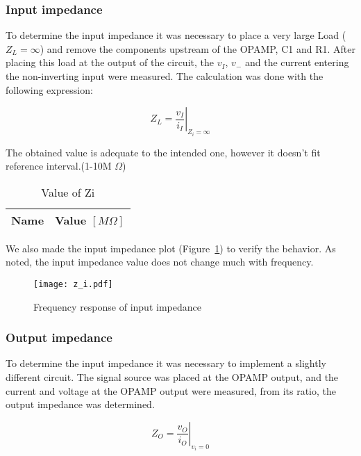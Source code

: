 \subsubsection{Input impedance}

To determine the input impedance it was necessary to place a very large Load ($Z_L=\infty$) and remove the components upstream of the OPAMP, C1 and R1. After placing this load at the output of the circuit, the $v_I$, $v_-$ and the current entering the non-inverting input were measured. The calculation was done with the following expression: 

\begin{equation}
    Z_L= \left. \frac{v_I}{i_I} \right|_{Z_i=\infty}
\end{equation}

The obtained value is adequate to the intended one, however it doesn't fit reference interval.(1-10M $\Omega$)

\begin{table}[H]
  \centering
  \begin{tabular}{|l|r|}
    \hline    
    {\bf Name} & {\bf Value $[M\Omega]$ } \\ \hline
    
  \end{tabular}
  \caption{Value of Zi}
  \label{tab:r}
\end{table}

We also made the input impedance plot (Figure~\ref{fig:zi}) to verify the behavior. As noted, the input impedance value does not change much with frequency. 
\vspace{-2 cm}
\begin{figure}[H]
    \centering
    \texttt{[image: z\_i.pdf]} 
    \caption{Frequency response of input impedance}
    \label{fig:zi}
\end{figure}

\subsubsection{Output impedance}

To determine the input impedance it was necessary to implement a slightly different circuit. The signal source was placed at the OPAMP output, and the current and voltage at the OPAMP output were measured, from its ratio, the output impedance was determined.

\begin{equation}
    Z_O = \left. \frac{v_O}{i_O} \right|_{v_i=0} 
\end{equation}

